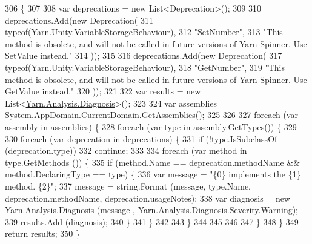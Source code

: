 \begin{DoxyCode}
306         \{
307 
308             var deprecations = \textcolor{keyword}{new} List<Deprecation>();
309 
310             deprecations.Add(\textcolor{keyword}{new} Deprecation(
311                 typeof(Yarn.Unity.VariableStorageBehaviour),
312                 \textcolor{stringliteral}{"SetNumber"},
313                 \textcolor{stringliteral}{"This method is obsolete, and will not be called in future versions of Yarn Spinner. Use
       SetValue instead."}
314             ));
315 
316             deprecations.Add(\textcolor{keyword}{new} Deprecation(
317                 typeof(Yarn.Unity.VariableStorageBehaviour),
318                 \textcolor{stringliteral}{"GetNumber"},
319                 \textcolor{stringliteral}{"This method is obsolete, and will not be called in future versions of Yarn Spinner. Use
       GetValue instead."}
320             ));
321 
322             var results = \textcolor{keyword}{new} List<\hyperlink{a00035}{Yarn.Analysis.Diagnosis}>();
323 
324             var assemblies = System.AppDomain.CurrentDomain.GetAssemblies();
325 
326 
327             \textcolor{keywordflow}{foreach} (var assembly \textcolor{keywordflow}{in} assemblies) \{
328                 \textcolor{keywordflow}{foreach} (var type \textcolor{keywordflow}{in} assembly.GetTypes()) \{
329 
330                     \textcolor{keywordflow}{foreach} (var deprecation \textcolor{keywordflow}{in} deprecations) \{
331                         \textcolor{keywordflow}{if} (!type.IsSubclassOf (deprecation.type))
332                             \textcolor{keywordflow}{continue};
333 
334                         \textcolor{keywordflow}{foreach} (var method \textcolor{keywordflow}{in} type.GetMethods ()) \{
335                             \textcolor{keywordflow}{if} (method.Name == deprecation.methodName && method.DeclaringType == type) \{
336                                 var message = \textcolor{stringliteral}{"\{0\} implements the \{1\} method. \{2\}"};
337                                 message = string.Format (message, type.Name, deprecation.methodName, 
      deprecation.usageNotes);
338                                 var diagnosis = \textcolor{keyword}{new} \hyperlink{a00035}{Yarn.Analysis.Diagnosis} (message
      , Yarn.Analysis.Diagnosis.Severity.Warning);
339                                 results.Add (diagnosis);
340                             \}
341                         \}
342 
343                     \}
344 
345 
346 
347                 \}
348             \}
349             \textcolor{keywordflow}{return} results;
350         \}
\end{DoxyCode}

